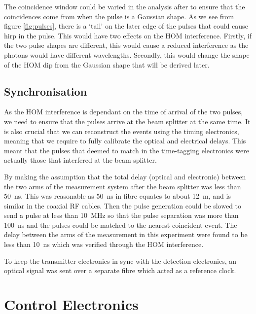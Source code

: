 The coincidence window could be varied in the analysis after to ensure that the coincidences come from when the pulse is a Gaussian shape. As we see from figure \ref{fig:pulses}, there is a `tail' on the later edge of the pulses that could cause hirp in the pulse. This would have two effects on the \ac{HOM} interference. Firstly, if the two pulse shapes are different, this would cause a reduced interference as the photons would have different wavelengths. Secondly, this would change the shape of the \ac{HOM} dip from the Gaussian shape that will be derived later.

\subsection{Synchronisation}

As the \ac{HOM} interference is dependant on the time of arrival of the two pulses, we need to ensure that the pulses arrive at the beam splitter at the same time. It is also crucial that we can reconstruct the events using the timing electronics, meaning that we require to fully calibrate the optical and electrical delays. This meant that the pulses that deemed to match in the time-tagging electronics were actually those that interfered at the beam splitter. 

By making the assumption that the total delay (optical and electronic) between the two arms of the measurement system after the beam splitter was less than \SI{50}{\ns}. This was reasonable as \SI{50}{\ns} in fibre equates to about \SI{12}{\m}, and is similar in the coaxial RF cables. Then the pulse generation could be slowed to send a pulse at less than \SI{10}{\MHz} so that the pulse separation was more than \SI{100}{\ns} and the pulses could be matched to the nearest coincident event. The delay between the arms of the measurement in this experiment were found to be less than \SI{10}{\ns} which was verified through the \ac{HOM} interference.

To keep the transmitter electronics in sync with the detection electronics, an optical signal was sent over a separate fibre which acted as a reference clock. 

\section{Control Electronics}




